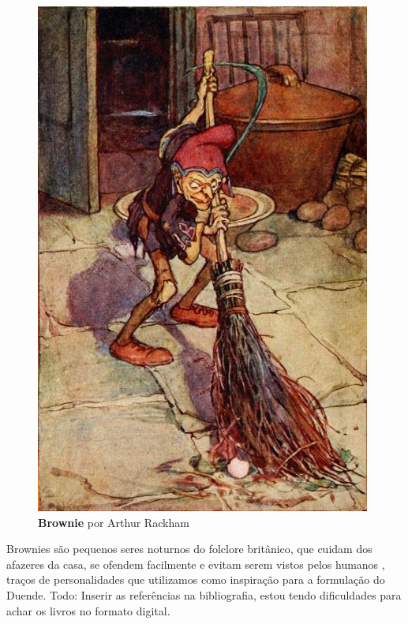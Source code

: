 \begin{figure}[htb]
	\caption{\label{fig_brownie}\textbf{Brownie} por Arthur Rackham }
	\begin{center}
	    \includegraphics[width=\textwidth/2]{imagens/brownie.jpg}
		\end{center}
\end{figure}

Brownies são pequenos seres noturnos do folclore britânico, que cuidam dos afazeres da casa, se ofendem facilmente e evitam serem vistos pelos humanos \cite{britannica_2011}\cite{carolyn_2016}, traços de personalidades que utilizamos como inspiração para a formulação do Duende.
Todo: Inserir as referências na bibliografia, estou tendo dificuldades para achar os livros no formato digital.

